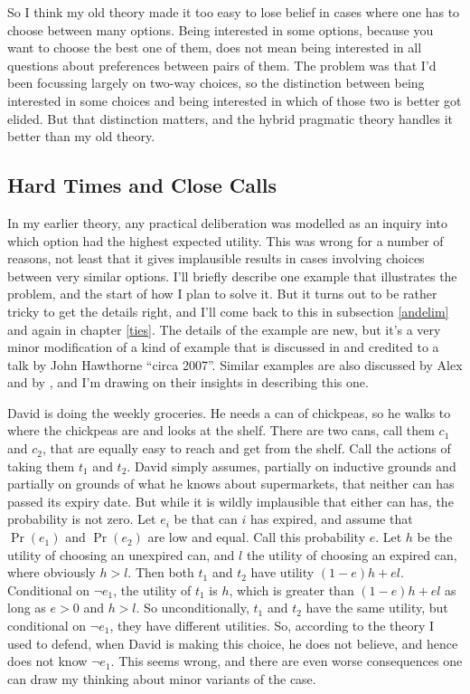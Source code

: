 \documentclass[11pt,]{book}
\begin{document}
So I think my old theory made it too easy to lose belief in cases where one has to choose between many options. Being interested in some options, because you want to choose the best one of them, does not mean being interested in all questions about preferences between pairs of them. The problem was that I'd been focussing largely on two-way choices, so the distinction between being interested in some choices and being interested in which of those two is better got elided. But that distinction matters, and the hybrid pragmatic theory handles it better than my old theory.

\hypertarget{meties}{%
\subsection{Hard Times and Close Calls}\label{meties}}

In my earlier theory, any practical deliberation was modelled as an inquiry into which option had the highest expected utility. This was wrong for a number of reasons, not least that it gives implausible results in cases involving choices between very similar options. I'll briefly describe one example that illustrates the problem, and the start of how I plan to solve it. But it turns out to be rather tricky to get the details right, and I'll come back to this in subsection \ref{andelim} and again in chapter \ref{ties}. The details of the example are new, but it's a very minor modification of a kind of example that is discussed in \citet{McGrathKim2019} and credited to a talk by John Hawthorne ``circa 2007''. Similar examples are also discussed by Alex \citet{Zweber2016} and by \citet{AndersonHawthorne2019b}, and I'm drawing on their insights in describing this one.

David is doing the weekly groceries. He needs a can of chickpeas, so he walks to where the chickpeas are and looks at the shelf. There are two cans, call them \(c_1\) and \(c_2\), that are equally easy to reach and get from the shelf. Call the actions of taking them \(t_1\) and \(t_2\). David simply assumes, partially on inductive grounds and partially on grounds of what he knows about supermarkets, that neither can has passed its expiry date. But while it is wildly implausible that either can has, the probability is not zero. Let \(e_i\) be that can \(i\) has expired, and assume that \(\Pr(e_1)\) and \(\Pr(e_2)\) are low and equal. Call this probability \(e\). Let \(h\) be the utility of choosing an unexpired can, and \(l\) the utility of choosing an expired can, where obviously \(h > l\). Then both \(t_1\) and \(t_2\) have utility \((1-e)h + el\). Conditional on \(\neg e_1\), the utility of \(t_1\) is \(h\), which is greater than \((1-e)h + el\) as long as \(e > 0\) and \(h > l\). So unconditionally, \(t_1\) and \(t_2\) have the same utility, but conditional on \(\neg e_1\), they have different utilities. So, according to the theory I used to defend, when David is making this choice, he does not believe, and hence does not know \(\neg e_1\). This seems wrong, and there are even worse consequences one can draw my thinking about minor variants of the case.
\end{document}
